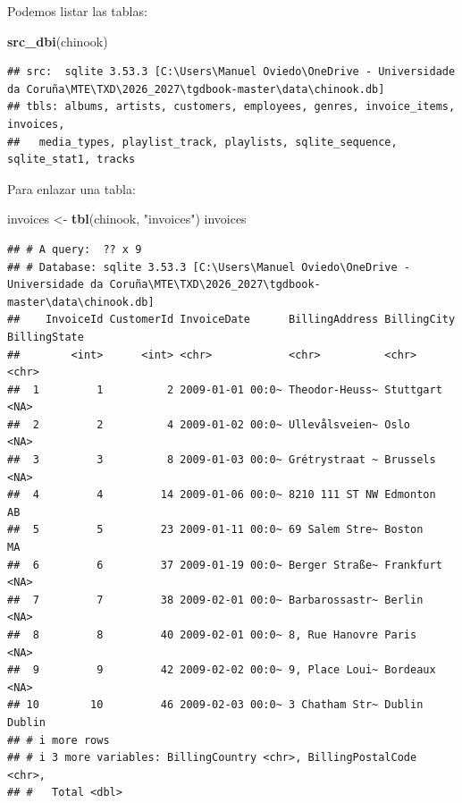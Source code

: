\documentclass[
]{book}
\newenvironment{Shaded}{\begin{snugshade}}{\end{snugshade}}
\newcommand{\FunctionTok}[1]{\textcolor[rgb]{0.13,0.29,0.53}{\textbf{#1}}}
\newcommand{\NormalTok}[1]{#1}
\newcommand{\OtherTok}[1]{\textcolor[rgb]{0.56,0.35,0.01}{#1}}
\newcommand{\StringTok}[1]{\textcolor[rgb]{0.31,0.60,0.02}{#1}}
\theoremstyle{break}
\theoremstyle{nonumberplain}
\begin{document}
Podemos listar las tablas:

\begin{Shaded}
\begin{Highlighting}[]
\FunctionTok{src\_dbi}\NormalTok{(chinook)}
\end{Highlighting}
\end{Shaded}

\begin{verbatim}
## src:  sqlite 3.53.3 [C:\Users\Manuel Oviedo\OneDrive - Universidade da Coruña\MTE\TXD\2026_2027\tgdbook-master\data\chinook.db]
## tbls: albums, artists, customers, employees, genres, invoice_items, invoices,
##   media_types, playlist_track, playlists, sqlite_sequence, sqlite_stat1, tracks
\end{verbatim}

Para enlazar una tabla:

\begin{Shaded}
\begin{Highlighting}[]
\NormalTok{invoices }\OtherTok{\textless{}{-}} \FunctionTok{tbl}\NormalTok{(chinook, }\StringTok{"invoices"}\NormalTok{)}
\NormalTok{invoices}
\end{Highlighting}
\end{Shaded}

\begin{verbatim}
## # A query:  ?? x 9
## # Database: sqlite 3.53.3 [C:\Users\Manuel Oviedo\OneDrive - Universidade da Coruña\MTE\TXD\2026_2027\tgdbook-master\data\chinook.db]
##    InvoiceId CustomerId InvoiceDate      BillingAddress BillingCity BillingState
##        <int>      <int> <chr>            <chr>          <chr>       <chr>       
##  1         1          2 2009-01-01 00:0~ Theodor-Heuss~ Stuttgart   <NA>        
##  2         2          4 2009-01-02 00:0~ Ullevålsveien~ Oslo        <NA>        
##  3         3          8 2009-01-03 00:0~ Grétrystraat ~ Brussels    <NA>        
##  4         4         14 2009-01-06 00:0~ 8210 111 ST NW Edmonton    AB          
##  5         5         23 2009-01-11 00:0~ 69 Salem Stre~ Boston      MA          
##  6         6         37 2009-01-19 00:0~ Berger Straße~ Frankfurt   <NA>        
##  7         7         38 2009-02-01 00:0~ Barbarossastr~ Berlin      <NA>        
##  8         8         40 2009-02-01 00:0~ 8, Rue Hanovre Paris       <NA>        
##  9         9         42 2009-02-02 00:0~ 9, Place Loui~ Bordeaux    <NA>        
## 10        10         46 2009-02-03 00:0~ 3 Chatham Str~ Dublin      Dublin      
## # i more rows
## # i 3 more variables: BillingCountry <chr>, BillingPostalCode <chr>,
## #   Total <dbl>
\end{verbatim}
\end{document}

